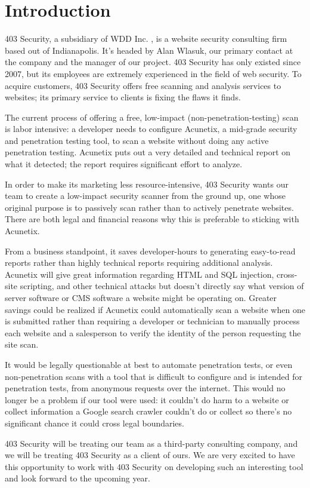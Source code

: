 \section{Introduction}

403 Security, a subsidiary of WDD Inc. , is a website security consulting firm based out of Indianapolis.  It’s headed by Alan Wlasuk, our primary contact at the company and the manager of our project. 403 Security has only existed  since 2007, but its employees are extremely experienced in the field of web security. To acquire customers, 403 Security offers free scanning and analysis services to websites; its primary service to clients is fixing the flaws it finds.

The current process of offering a free, low-impact (non-penetration-testing) scan is labor intensive: a developer needs to configure Acunetix, a mid-grade security and penetration testing tool, to scan a website without doing any active penetration testing. Acunetix puts out a very detailed and technical report on what it detected; the report requires significant effort to analyze.

In order to make its marketing less resource-intensive, 403 Security wants our team to create a low-impact security scanner from the ground up, one whose original purpose is to passively scan rather than to actively penetrate websites. There are both legal and financial reasons why this is preferable to sticking with Acunetix.

From a business standpoint, it saves developer-hours to  generating easy-to-read reports rather than highly technical reports requiring additional analysis. Acunetix will give great information regarding HTML and SQL injection, cross-site scripting, and other technical attacks but doesn’t directly say what version of server software or CMS software a website might be operating on. Greater savings could be realized if Acunetix could automatically scan a website when one is submitted rather than requiring a developer or technician to manually process each website and a salesperson to verify the identity of the person requesting the site scan.
    
It would be legally questionable at best to automate penetration tests, or even non-penetration scans with a tool that is difficult to configure and is intended for penetration tests, from anonymous requests over the internet. This would no longer be a problem if our tool were used: it couldn’t do harm to a website or collect information a Google search crawler couldn’t do or collect so there’s no significant chance it could cross legal boundaries.

403 Security will be treating our team as a third-party consulting company, and we will be treating 403 Security as a client of ours. We are very excited to have this opportunity to work with 403 Security on developing such an interesting tool and look forward to the upcoming year.

